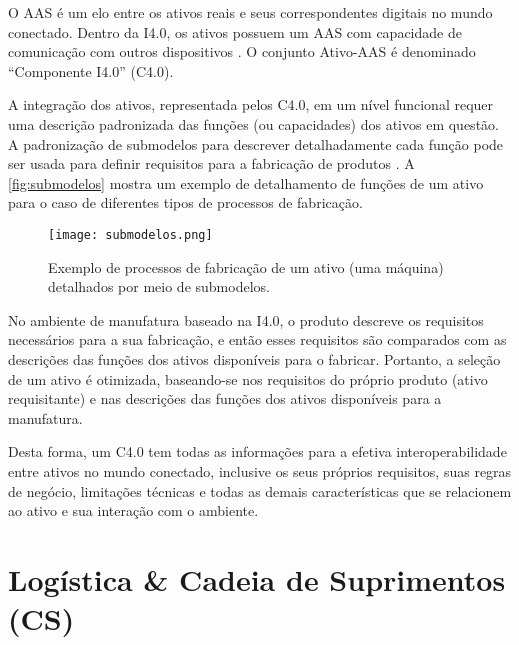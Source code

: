 O AAS é um elo entre os ativos reais e seus correspondentes digitais no mundo conectado. Dentro da I4.0, os ativos possuem um AAS com capacidade de comunicação com outros dispositivos \cite{bader2019aas}. O conjunto Ativo-AAS é denominado ``Componente I4.0'' (C4.0).



A integração dos ativos, representada pelos C4.0, em um nível funcional requer uma descrição padronizada das funções (ou capacidades) dos ativos em questão. A padronização de submodelos para descrever detalhadamente cada função pode ser usada para definir requisitos para a fabricação de produtos \cite{bedenbender2017aasexamples}. A \autoref{fig:submodelos} mostra um exemplo de detalhamento de funções de um ativo para o caso de diferentes tipos de processos de fabricação.

\begin{figure}[htb]
	\centering
	\texttt{[image: submodelos.png]}
	\caption{Exemplo de processos de fabricação de um ativo (uma máquina) detalhados por meio de submodelos.}
	\label{fig:submodelos}
\end{figure}

No ambiente de manufatura baseado na I4.0, o produto descreve os requisitos necessários para a sua fabricação, e então esses requisitos são comparados com as descrições das funções dos ativos disponíveis para o fabricar. Portanto, a seleção de um ativo é otimizada, baseando-se nos requisitos do próprio produto (ativo requisitante) e nas descrições das funções dos ativos disponíveis para a manufatura.

Desta forma, um C4.0 tem todas as informações para a efetiva interoperabilidade entre ativos no mundo conectado, inclusive os seus próprios requisitos, suas regras de negócio, limitações técnicas e todas as demais características que se relacionem ao ativo e sua interação com o ambiente.

\section{Logística \& Cadeia de Suprimentos (CS)}
\label{sec:logistica}

